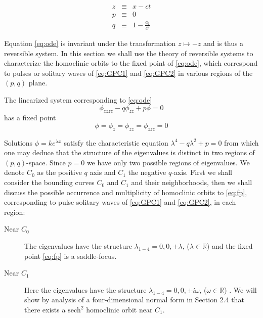 \begin{subequations}
\begin{eqnarray}
z &\equiv& x - c t\\
p &\equiv& 0\label{eq:pdef} \\
q &\equiv & 1 - \frac{a_1}{c^2} \label{eq:qdef} 
\end{eqnarray}
\end{subequations}

Equation \eqref{eq:ode} is invariant under the transformation $ z \mapsto -z $ and is thus a reversible system. In this section we shall
use the theory of reversible systems to characterize the homoclinic orbits to the fixed point of \eqref{eq:ode}, which correspond to pulses
or solitary waves of \eqref{eq:GPC1} and \eqref{eq:GPC2} in various regions of the $(p,q)$ plane.

The linearized system corresponding to \eqref{eq:ode}
\begin{equation}
 \label{eq:linode} \phi_{zzzz} - q \phi_{zz} + p \phi = 0
\end{equation}
has a fixed point \begin{equation}\label{eq:fp} \phi = \phi_z = \phi_{zz} = \phi_{zzz} = 0 \end{equation}

Solutions $\phi = k e^{\lambda x}$ satisfy the characteristic equation
$\lambda^4 - q \lambda^2 + p = 0 $ from which one may deduce that the structure
of the eigenvalues is distinct in two regions of $\left(p,q\right)$-space.
Since $p=0$ we have only two possible regions of eigenvalues.  We denote $C_0$
as the positive $q$ axis and $C_1$ the negative $q$-axis. First we shall 
consider the bounding curves $C_0$ and $C_1$ and their neighborhoods, then we shall discuss the possible
occurrence and multiplicity of homoclinic orbits to \eqref{eq:fp}, corresponding
to pulse solitary waves of \eqref{eq:GPC1} and \eqref{eq:GPC2}, in each region:

\begin{description}
\item[Near $C_0$] 
The eigenvalues have the structure $\lambda_{1-4} = 0,0,\pm \lambda$, ($\lambda \in \mathbb{R}$) and the fixed point
\eqref{eq:fp} is a saddle-focus.
\item[Near $C_1$] 
Here the eigenvalues have the structure $\lambda_{1-4} = 0,0,\pm i \omega $, ($\omega \in \mathbb{R}$) . We will show by analysis of a
four-dimensional normal form in Section 2.4 that there exists a $\mathrm{sech}^2$ homoclinic orbit near $C_1$.
\end{description}

